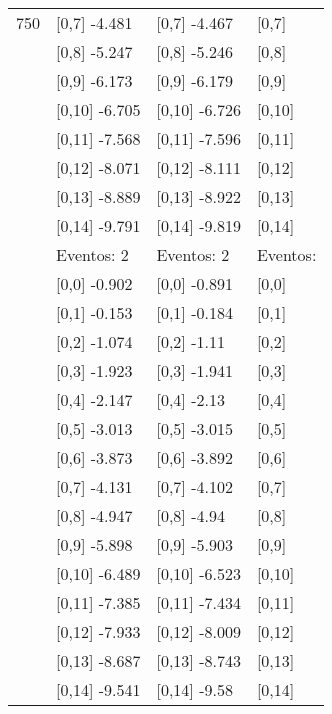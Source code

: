 \begin{table}
\begin{tabular}[t]{llll}
750 & {}[0,7] -4.481 & {}[0,7] -4.467 & {}[0,7]\\
\addlinespace
 & {}[0,8] -5.247 & {}[0,8] -5.246 & {}[0,8]\\
 & {}[0,9] -6.173 & {}[0,9] -6.179 & {}[0,9]\\
 & {}[0,10] -6.705 & {}[0,10] -6.726 & {}[0,10]\\
 & {}[0,11] -7.568 & {}[0,11] -7.596 & {}[0,11]\\
 & {}[0,12] -8.071 & {}[0,12] -8.111 & {}[0,12]\\
\addlinespace
 & {}[0,13] -8.889 & {}[0,13] -8.922 & {}[0,13]\\
 & {}[0,14] -9.791 & {}[0,14] -9.819 & {}[0,14]\\
 & Eventos:  2 & Eventos:  2 & Eventos:\\
 & {}[0,0] -0.902 & {}[0,0] -0.891 & {}[0,0]\\
 & {}[0,1] -0.153 & {}[0,1] -0.184 & {}[0,1]\\
\addlinespace
 & {}[0,2] -1.074 & {}[0,2] -1.11 & {}[0,2]\\
 & {}[0,3] -1.923 & {}[0,3] -1.941 & {}[0,3]\\
 & {}[0,4] -2.147 & {}[0,4] -2.13 & {}[0,4]\\
 & {}[0,5] -3.013 & {}[0,5] -3.015 & {}[0,5]\\
 & {}[0,6] -3.873 & {}[0,6] -3.892 & {}[0,6]\\
\addlinespace
1000 & {}[0,7] -4.131 & {}[0,7] -4.102 & {}[0,7]\\
 & {}[0,8] -4.947 & {}[0,8] -4.94 & {}[0,8]\\
 & {}[0,9] -5.898 & {}[0,9] -5.903 & {}[0,9]\\
 & {}[0,10] -6.489 & {}[0,10] -6.523 & {}[0,10]\\
 & {}[0,11] -7.385 & {}[0,11] -7.434 & {}[0,11]\\
\addlinespace
 & {}[0,12] -7.933 & {}[0,12] -8.009 & {}[0,12]\\
 & {}[0,13] -8.687 & {}[0,13] -8.743 & {}[0,13]\\
 & {}[0,14] -9.541 & {}[0,14] -9.58 & {}[0,14]\\
\bottomrule
\end{tabular}
\end{table}
